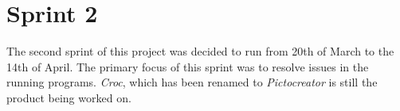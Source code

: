 \chapter{Sprint 2}
The second sprint of this project was decided to run from 20th of March to the 14th of April.
The primary focus of this sprint was to resolve issues in the running programs.
\textit{Croc}, which has been renamed to \textit{Pictocreator} is still the product being worked on.



